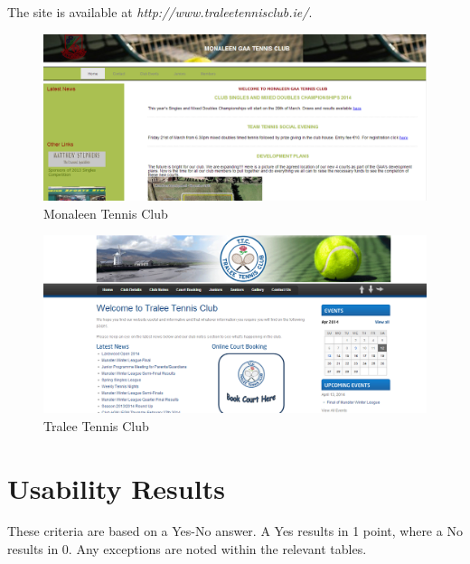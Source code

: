 The site is available at \textit{http://www.traleetennisclub.ie/}.
\newpage

\begin{figure}[H]
\begin{center}
\includegraphics[scale=0.7, angle=90]{monaleen.PNG}
\end{center}
\caption{Monaleen Tennis Club}
\end{figure}


\begin{figure}[H]
\begin{center}
\includegraphics[scale=0.7, angle=90]{tralee.PNG}
\end{center}
\caption{Tralee Tennis Club}
\end{figure}

\section{Usability Results}
\label{sec:usabilty}

These criteria are based on a Yes-No answer. A Yes results in 1 point, where a No results in 0. Any exceptions are noted within the relevant tables.

